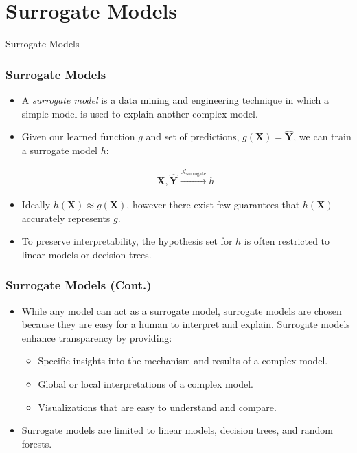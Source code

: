 \section{Surrogate Models}

\begin{frame}[c]
\Huge{\centerline{Surrogate Models}}
\end{frame}


\begin{frame}\frametitle{Surrogate Models}
	\begin{itemize}
	        \item A \textit{surrogate model} is a data mining and engineering technique in which a simple model is used to explain another complex model.
		\item Given our learned function $g$ and set of predictions, $g(\mathbf{X}) = \hat{\mathbf{Y}}$, we can train a surrogate model $h$:
			
			\begin{equation}
			\begin{aligned}
				 \mathbf{X},\hat{\mathbf{Y}} \xrightarrow{\mathcal{A}_{\text{surrogate}}} h\
			\end{aligned}
			\end{equation}
		\item Ideally $h(\mathbf{X}) \approx g(\mathbf{X})$, however there exist few guarantees that $h(\mathbf{X})$ accurately represents $g$.
		\item To preserve interpretability, the hypothesis set for $h$ is often restricted to linear models or decision trees.
	\end{itemize}
\end{frame}


\begin{frame}\frametitle{Surrogate Models (Cont.)}
	\begin{itemize}
	        \item While any model can act as a surrogate model, surrogate models are chosen because they are easy for a human to interpret and explain. Surrogate models enhance transparency by providing:
	        \bigskip
	        \begin{itemize}
	        \item Specific insights into the mechanism and results of a complex model.
	        \item Global or local interpretations of a complex model.
	        \item Visualizations that are easy to understand and compare.
	        \end{itemize}
	        \bigskip
	        \item Surrogate models are limited to linear models, decision trees, and random forests.
	
	\end{itemize}
\end{frame}


